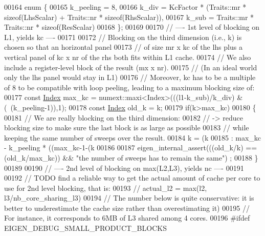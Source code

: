 \begin{DoxyCode}
00164     \textcolor{keyword}{enum} \{
00165       k\_peeling = 8,
00166       k\_div = KcFactor * (Traits::mr * \textcolor{keyword}{sizeof}(LhsScalar) + Traits::nr * \textcolor{keyword}{sizeof}(RhsScalar)),
00167       k\_sub = Traits::mr * Traits::nr * \textcolor{keyword}{sizeof}(ResScalar)
00168     \};
00169 
00170     \textcolor{comment}{// ---- 1st level of blocking on L1, yields kc ----}
00171 
00172     \textcolor{comment}{// Blocking on the third dimension (i.e., k) is chosen so that an horizontal panel}
00173     \textcolor{comment}{// of size mr x kc of the lhs plus a vertical panel of kc x nr of the rhs both fits within L1 cache.}
00174     \textcolor{comment}{// We also include a register-level block of the result (mx x nr).}
00175     \textcolor{comment}{// (In an ideal world only the lhs panel would stay in L1)}
00176     \textcolor{comment}{// Moreover, kc has to be a multiple of 8 to be compatible with loop peeling, leading to a maximum
       blocking size of:}
00177     \textcolor{keyword}{const} \hyperlink{namespace_eigen_a62e77e0933482dafde8fe197d9a2cfde}{Index} max\_kc = numext::maxi<Index>(((l1-k\_sub)/k\_div) & (~(k\_peeling-1)),1);
00178     \textcolor{keyword}{const} \hyperlink{namespace_eigen_a62e77e0933482dafde8fe197d9a2cfde}{Index} old\_k = k;
00179     \textcolor{keywordflow}{if}(k>max\_kc)
00180     \{
00181       \textcolor{comment}{// We are really blocking on the third dimension:}
00182       \textcolor{comment}{// -> reduce blocking size to make sure the last block is as large as possible}
00183       \textcolor{comment}{//    while keeping the same number of sweeps over the result.}
00184       k = (k%
00185                         : max\_kc - k\_peeling * ((max\_kc-1-(k%
00186 
00187       eigen\_internal\_assert(((old\_k/k) == (old\_k/max\_kc)) && \textcolor{stringliteral}{"the number of sweeps has to remain the same"})
      ;
00188     \}
00189 
00190     \textcolor{comment}{// ---- 2nd level of blocking on max(L2,L3), yields nc ----}
00191 
00192     \textcolor{comment}{// TODO find a reliable way to get the actual amount of cache per core to use for 2nd level blocking,
       that is:}
00193     \textcolor{comment}{//      actual\_l2 = max(l2, l3/nb\_core\_sharing\_l3)}
00194     \textcolor{comment}{// The number below is quite conservative: it is better to underestimate the cache size rather than
       overestimating it)}
00195     \textcolor{comment}{// For instance, it corresponds to 6MB of L3 shared among 4 cores.}
00196 \textcolor{preprocessor}{    #ifdef EIGEN\_DEBUG\_SMALL\_PRODUCT\_BLOCKS}

\end{DoxyCode}
